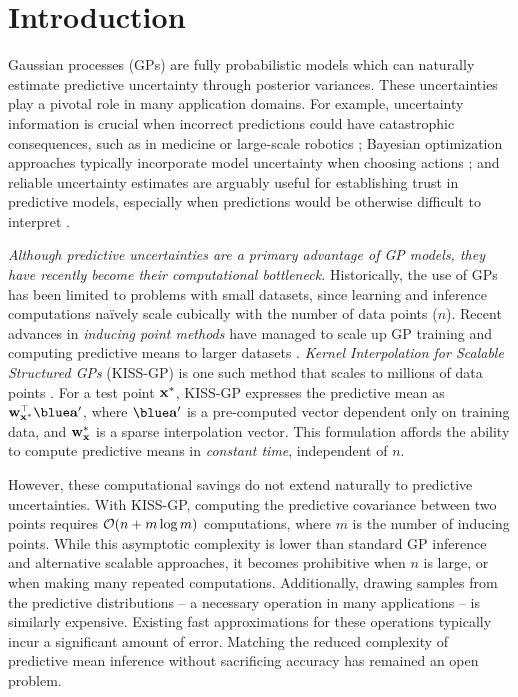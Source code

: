 \section{Introduction}
Gaussian processes (GPs) are fully probabilistic models which can naturally estimate predictive uncertainty through posterior variances.
These uncertainties play a pivotal role in many application domains.
For example, uncertainty information is crucial when incorrect predictions could have catastrophic consequences, such as in medicine \cite{schulam2017if} or large-scale robotics \cite{deisenroth2015gaussian};
Bayesian optimization approaches typically incorporate model uncertainty when choosing actions \cite{snoek2012practical,deisenroth2011pilco,wang2017max};
and reliable uncertainty estimates are arguably useful for establishing trust in predictive models,
especially when predictions would be otherwise difficult to interpret
\cite{doshi2017roadmap,zhou2017effects}.

\emph{Although predictive uncertainties are a primary advantage of GP models, they have recently become their computational bottleneck.}
Historically, the use of GPs has been limited to problems with small datasets, since learning and inference computations na\"ively scale cubically with the number of data points ($n$).
Recent advances in \emph{inducing point methods} have managed to scale up GP training and computing predictive means to larger datasets \cite{snelson2006sparse,quinonero2005unifying,titsias2009variational}.
\emph{Kernel Interpolation for Scalable Structured GPs} (KISS-GP) is one such method that scales to millions of data points \cite{wilson2015kernel,wilson2015thoughts}.
For a test point $\mathbf{x}^*$, KISS-GP expresses the predictive mean as $\bw_{\bxtest}^\top {\blue \ba'}$, where $\blue \ba'$ is a pre-computed vector dependent only on training data, and $\bw_\bxtest$ is a sparse interpolation vector.
This formulation affords the ability to compute predictive means in \emph{constant time}, independent of $n$.

However, these computational savings do not extend naturally to predictive uncertainties.
With KISS-GP, computing the predictive covariance between two points requires $\bigo{n + m \log m}$ computations, where $m$ is the number of inducing points.
While this asymptotic complexity is lower than standard GP inference and alternative scalable approaches, it becomes prohibitive when $n$ is large, or when making many repeated computations.
Additionally, drawing samples from the predictive distributions -- a necessary operation in many applications -- is similarly expensive.
Existing fast approximations for these operations \cite{papandreou2011efficient,wilson2015thoughts,wang2017max} typically incur a significant amount of error.
Matching the reduced complexity of predictive mean inference without sacrificing accuracy has remained an open problem.

